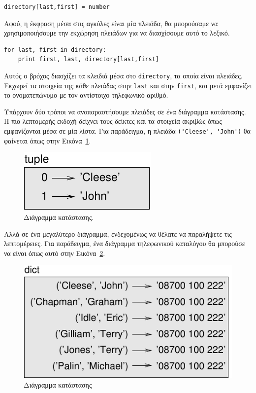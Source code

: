 \documentclass[10pt]{book}
\begin{document}
\begin{verbatim}
directory[last,first] = number
\end{verbatim}
%
Αφού, η έκφραση μέσα στις αγκύλες είναι μία πλειάδα, θα μπορούσαμε να χρησιμοποιήσουμε την εκχώρηση πλειάδων για να διασχίσουμε αυτό το λεξικό.

 
\begin{verbatim}
for last, first in directory:
    print first, last, directory[last,first]
\end{verbatim}
%
Αυτός ο βρόχος διασχίζει τα κλειδιά μέσα στο {\tt directory}, τα οποία είναι πλειάδες. Εκχωρεί τα στοιχεία της κάθε πλειάδας στην {\tt last} και στην {\tt first}, και μετά εμφανίζει το ονοματεπώνυμο με τον αντίστοιχο τηλεφωνικό αριθμό.

Υπάρχουν δύο τρόποι να αναπαραστήσουμε πλειάδες σε ένα διάγραμμα κατάστασης. Η πιο λεπτομερής εκδοχή δείχνει τους δείκτες και τα στοιχεία ακριβώς όπως εμφανίζονται μέσα σε μία λίστα. Για παράδειγμα, η πλειάδα \verb"('Cleese', 'John')" θα φαίνεται όπως στην Εικόνα~\ref{fig.tuple1}.

\begin{figure}
\centerline
{\includegraphics[scale=0.8]{figs/tuple1.pdf}}
 \caption{Διάγραμμα κατάστασης.} 
\label{fig.tuple1}
\end{figure}

Αλλά σε ένα μεγαλύτερο διάγραμμα, ενδεχομένως να θέλατε να παραλήψετε τις λεπτομέρειες. Για παράδειγμα, ένα διάγραμμα τηλεφωνικού καταλόγου θα μπορούσε να είναι όπως αυτό στην Εικόνα~\ref{fig.dict2}.

\begin{figure}
\centerline
{\includegraphics[scale=0.8]{figs/dict2.pdf}}
 \caption{Διάγραμμα κατάστασης}
\label{fig.dict2}
\end{figure}
\end{document}
